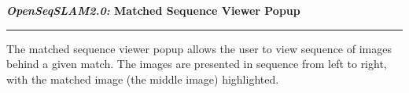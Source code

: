 \centerline{\textbf{\textit{OpenSeqSLAM2.0:} Matched Sequence Viewer Popup}}
\noindent\rule{\textwidth}{2pt}
\bigskip
\parbox{\textwidth}{The matched sequence viewer popup allows the user to view sequence of images behind a given match. The images are presented in sequence from left to right, with the matched image (the middle image) highlighted.}
